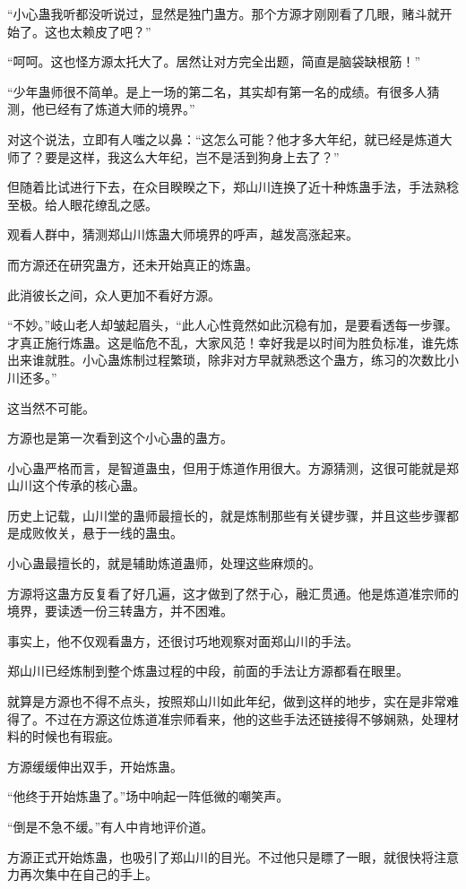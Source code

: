 \begin{this_body}
“小心蛊我听都没听说过，显然是独门蛊方。那个方源才刚刚看了几眼，赌斗就开始了。这也太赖皮了吧？”

“呵呵。这也怪方源太托大了。居然让对方完全出题，简直是脑袋缺根筋！”

“少年蛊师很不简单。是上一场的第二名，其实却有第一名的成绩。有很多人猜测，他已经有了炼道大师的境界。”

对这个说法，立即有人嗤之以鼻：“这怎么可能？他才多大年纪，就已经是炼道大师了？要是这样，我这么大年纪，岂不是活到狗身上去了？”

但随着比试进行下去，在众目睽睽之下，郑山川连换了近十种炼蛊手法，手法熟稔至极。给人眼花缭乱之感。

观看人群中，猜测郑山川炼蛊大师境界的呼声，越发高涨起来。

而方源还在研究蛊方，还未开始真正的炼蛊。

此消彼长之间，众人更加不看好方源。

“不妙。”岐山老人却皱起眉头，“此人心性竟然如此沉稳有加，是要看透每一步骤。才真正施行炼蛊。这是临危不乱，大家风范！幸好我是以时间为胜负标准，谁先炼出来谁就胜。小心蛊炼制过程繁琐，除非对方早就熟悉这个蛊方，练习的次数比小川还多。”

这当然不可能。

方源也是第一次看到这个小心蛊的蛊方。

小心蛊严格而言，是智道蛊虫，但用于炼道作用很大。方源猜测，这很可能就是郑山川这个传承的核心蛊。

历史上记载，山川堂的蛊师最擅长的，就是炼制那些有关键步骤，并且这些步骤都是成败攸关，悬于一线的蛊虫。

小心蛊最擅长的，就是辅助炼道蛊师，处理这些麻烦的。

方源将这蛊方反复看了好几遍，这才做到了然于心，融汇贯通。他是炼道准宗师的境界，要读透一份三转蛊方，并不困难。

事实上，他不仅观看蛊方，还很讨巧地观察对面郑山川的手法。

郑山川已经炼制到整个炼蛊过程的中段，前面的手法让方源都看在眼里。

就算是方源也不得不点头，按照郑山川如此年纪，做到这样的地步，实在是非常难得了。不过在方源这位炼道准宗师看来，他的这些手法还链接得不够娴熟，处理材料的时候也有瑕疵。

方源缓缓伸出双手，开始炼蛊。

“他终于开始炼蛊了。”场中响起一阵低微的嘲笑声。

“倒是不急不缓。”有人中肯地评价道。

方源正式开始炼蛊，也吸引了郑山川的目光。不过他只是瞟了一眼，就很快将注意力再次集中在自己的手上。


\end{this_body}
